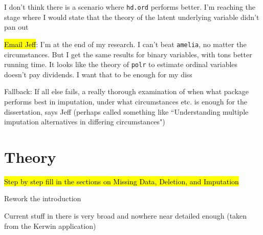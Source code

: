 \begin{coi}
		\item I don't think there is a scenario where \texttt{hd.ord} performs better. I'm reaching the stage where I would state that the theory of the latent underlying variable didn't pan out
		\item \hl{Email Jeff}: I'm at the end of my research. I can't beat \texttt{amelia}, no matter the circumstances. But I get the same results for binary variables, with tons better running time. It looks like the theory of \texttt{polr} to estimate ordinal variables doesn't pay dividends. I want that to be enough for my diss
		\item Fallback: If all else fails, a really thorough examination of when what package performs best in imputation, under what circumstances etc. is enough for the dissertation, says Jeff (perhaps called something like ``Understanding multiple imputation alternatives in differing circumstances")
	\end{coi}



\section*{Theory}
	\begin{coi}
		\item \hl{Step by step fill in the sections on Missing Data, Deletion, and Imputation}
		\item Rework the introduction
			\begin{coi}
				\item Current stuff in there is very broad and nowhere near detailed enough (taken from the Kerwin application)
			\end{coi}
	\end{coi}


			

